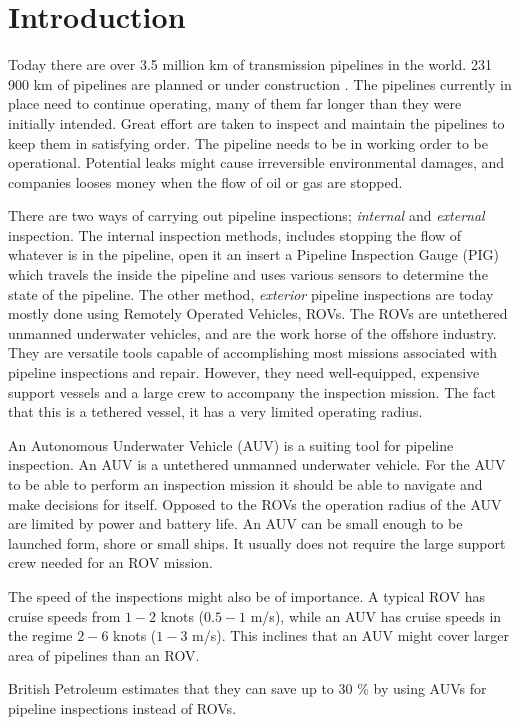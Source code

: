 \chapter{Introduction}
	Today there are over 3.5 million km of transmission pipelines in the world. 231 900 km of pipelines
	are planned or under construction \cite{DNV_pipelines}. The pipelines currently in place need to
	continue operating, many of them far longer than they were initially intended. Great effort are taken
	to inspect and maintain the pipelines to keep them in satisfying order.  The pipeline needs to be 
	in working order to be operational.
	Potential leaks might cause irreversible environmental damages, and companies looses money when the
	flow of oil or gas are stopped. 

	There are two ways of carrying out pipeline inspections; \textit{internal} and \textit{external} 
	inspection. The internal inspection methods, includes stopping the flow of whatever is in the pipeline,
	open it an insert a Pipeline Inspection Gauge (PIG) which travels the inside the pipeline and uses various
	sensors to determine the state of the pipeline. The other method, \textit{exterior} pipeline
	inspections are today mostly done using Remotely Operated Vehicles, ROVs. The ROVs are untethered
	unmanned underwater vehicles, and are the work horse of the offshore industry. They are versatile
	tools capable of accomplishing most missions associated with pipeline inspections and repair. However,
	they need well-equipped, expensive support vessels and a large crew to accompany the inspection
	mission. The fact that this is a tethered vessel, it has a very limited operating radius. 

	An Autonomous Underwater Vehicle (AUV) is a suiting tool for pipeline inspection. An AUV is a
	untethered unmanned underwater vehicle. For the AUV to be able to perform an inspection mission it
	should be able to navigate and make decisions for itself. Opposed to the ROVs the operation radius of
	the AUV are limited by power and battery life. An AUV can be small enough to be launched form, shore
	or small ships. It usually does not require the large support crew needed for an ROV mission.

	The speed of the inspections might also be of importance. A typical ROV has cruise speeds from $1-2$
	knots ($0.5-1$ m/s), while an AUV has cruise speeds in the regime $2-6$ knots ($1-3$ m/s). This
	inclines that an AUV might cover larger area of pipelines than an ROV. 

	British Petroleum estimates that they can save up to 30 \% by using AUVs for pipeline inspections
	instead of ROVs.\cite{PhD_lecture}

